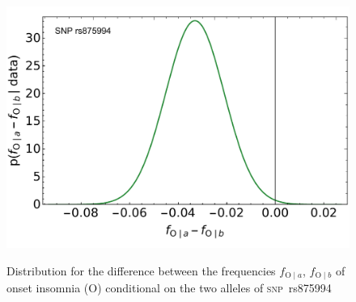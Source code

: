 \documentclass[\ifafour a4paper,12pt,\else a5paper,10pt,\fi%
onecolumn,oneside,article,%
british%
]{memoir}
\theoremstyle{remark}
\theoremstyle{innote}
\renewcommand*{\|}{\mathpunct{|}}
\newcommand*{\snp}{\textsc{snp}}
\newcommand*{\ya}{a}
\newcommand*{\yb}{b}
\newcommand*{\ysA}{\textrm{O}}%
\begin{document}
\begin{figure}[b!]%
 \centering\includegraphics[width=0.75\linewidth]{difference_symA_snp6.pdf}\\
 \caption{Distribution for the difference between the frequencies
   $f_{\ysA\|\ya}$, $f_{\ysA\|\yb}$ of onset insomnia ($\ysA$) conditional on
   the two alleles of \snp\ rs875994}\label{fig:difference_distributions}
\end{figure}%

\newpage
\appendix
\end{document}
